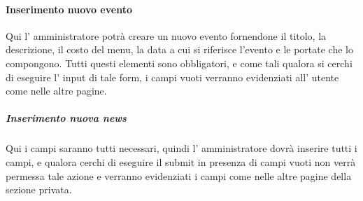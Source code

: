 \paragraph{Inserimento nuovo evento}
Qui l' amministratore potrà creare un nuovo evento fornendone il titolo, la descrizione, il costo del menu, la data a cui si riferisce l'evento e le portate che lo compongono. Tutti questi elementi sono obbligatori, e come tali qualora si cerchi di eseguire l' input di tale form, i campi vuoti verranno evidenziati all' utente come nelle altre pagine.
\subparagraph{Inserimento nuova news}
Qui i campi saranno tutti necessari, quindi l' amministratore dovrà inserire tutti i campi, e qualora cerchi di eseguire il submit in presenza di campi vuoti non verrà permessa tale azione e verranno evidenziati i campi come nelle altre pagine della sezione privata.

